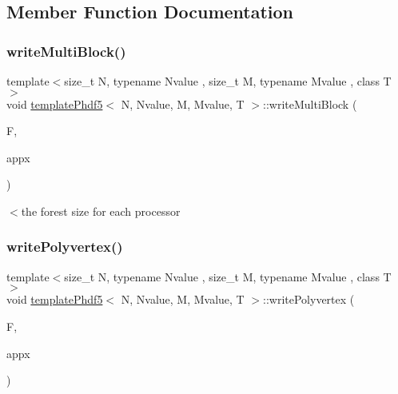 \subsection{Member Function Documentation}
\mbox{\label{classtemplatePhdf5_ad51ba0f27b82620be3bcc6c1e863ba6c}} 
\subsubsection{\texorpdfstring{write\+Multi\+Block()}{writeMultiBlock()}}
{\footnotesize\ttfamily template$<$size\+\_\+t N, typename Nvalue , size\+\_\+t M, typename Mvalue , class T $>$ \\
void \mbox{\hyperlink{classtemplatePhdf5}{template\+Phdf5}}$<$ N, Nvalue, M, Mvalue, T $>$\+::write\+Multi\+Block (\begin{DoxyParamCaption}\item[{\mbox{\hyperlink{classTemplateForest}{Template\+Forest}}$<$ N, Nvalue, M, Mvalue, T $>$ \&}]{F,  }\item[{\mbox{\hyperlink{definitions_8h_a69aa29b598b851b0640aa225a9e5d61d}{uint}}}]{appx }\end{DoxyParamCaption})}

$<$the forest size for each processor \mbox{\label{classtemplatePhdf5_a9c8c901d7a7472682a65678668f9d748}} 
\subsubsection{\texorpdfstring{write\+Polyvertex()}{writePolyvertex()}}
{\footnotesize\ttfamily template$<$size\+\_\+t N, typename Nvalue , size\+\_\+t M, typename Mvalue , class T $>$ \\
void \mbox{\hyperlink{classtemplatePhdf5}{template\+Phdf5}}$<$ N, Nvalue, M, Mvalue, T $>$\+::write\+Polyvertex (\begin{DoxyParamCaption}\item[{\mbox{\hyperlink{classTemplateForest}{Template\+Forest}}$<$ N, Nvalue, M, Mvalue, T $>$ \&}]{F,  }\item[{\mbox{\hyperlink{definitions_8h_a69aa29b598b851b0640aa225a9e5d61d}{uint}}}]{appx }\end{DoxyParamCaption})}

